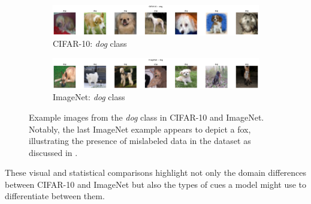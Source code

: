 \begin{figure}[H]
    \centering
    \begin{subfigure}[b]{\textwidth}
        \centering
        \includegraphics[width=\textwidth]{Plots/DatasetOverview/cifar_dog_7_grid.pdf}
        \caption{CIFAR-10: \textit{dog} class}
        \label{fig:cifar-dog}
    \end{subfigure}

    \begin{subfigure}[b]{\textwidth}
        \centering
        \includegraphics[width=\textwidth]{Plots/DatasetOverview/imageNet_dog_7_grid.pdf}
        \caption{ImageNet: \textit{dog} class}
        \label{fig:imagenet-dog}
    \end{subfigure}
    
    \caption{Example images from the \textit{dog} class in CIFAR-10 and ImageNet. Notably, the last ImageNet example appears to depict a fox, illustrating the presence of mislabeled data in the dataset as discussed in \cite{northcutt2021confident}.}
    \label{fig:dog-comparison}
\end{figure}

These visual and statistical comparisons highlight not only the domain differences between CIFAR-10 and ImageNet but also the types of cues a model 
might use to differentiate between them.

